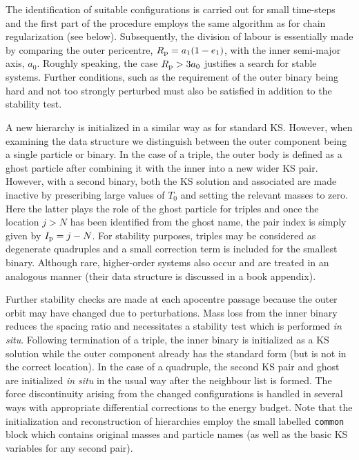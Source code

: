 \documentclass[12pt]{article}
\begin{document}
The identification of suitable configurations is carried out for small \cm
time-steps and the first part of the procedure employs the same algorithm
as for chain regularization (see below).
Subsequently, the division of labour is essentially made by comparing the
outer pericentre, $R_{\rm p} = a_1 (1 - e_1)$, with the inner semi-major
axis, $a_0$.
Roughly speaking, the case $R_{\rm p} > 3 a_0$ justifies a search for stable
systems.
Further conditions, such as the requirement of the outer binary being hard
and not too strongly perturbed must also be satisfied in addition to the
stability test.

A new hierarchy is initialized in a similar way as for standard KS.
However, when examining the data structure we distinguish between the outer
component being a single particle or binary.
In the case of a triple, the outer body is defined as a ghost particle after
combining it with the inner \cm into a new wider KS pair.
However, with a second binary, both the KS solution and associated \cm are
made inactive by prescribing large values of $T_0$ and setting the relevant
masses to zero.
Here the latter plays the role of the ghost particle for triples and once
the \cm location $j > N$ has been identified from the ghost name, the pair
index is simply given by $I_{\rm p} = j - N$.
For stability purposes, triples may be considered as degenerate quadruples
and a small correction term is included for the smallest binary.
Although rare, higher-order systems also occur and are treated in an
analogous manner (their data structure is discussed in a book appendix). 

Further stability checks are made at each apocentre passage because the outer
orbit may have changed due to perturbations.
Mass loss from the inner binary reduces the spacing ratio and necessitates a
stability test which is performed {\it in situ}.
Following termination of a triple, the inner binary is initialized as a KS
solution while the outer component already has the standard form (but is not
in the correct location).
In the case of a quadruple, the second KS pair and ghost \cm are initialized
{\it in situ} in the usual way after the neighbour list is formed.
The force discontinuity arising from the changed configurations is handled in
several ways with appropriate differential corrections to the energy budget.
Note that the initialization and reconstruction of hierarchies employ the
small labelled {\tt common} block {} which contains original
masses and particle names (as well as the basic KS variables for any second
pair).
\end{document}
